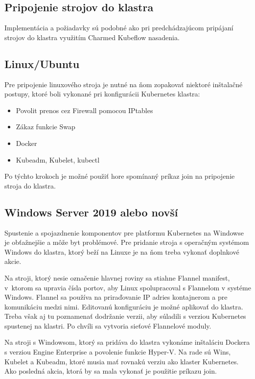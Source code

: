 \subsection{Pripojenie strojov do klastra}

Implementácia a požiadavky sú podobné ako pri predchádzajúcom pripájaní strojov do klastra využitím Charmed Kubeflow nasadenia.

\subsection*{Linux/Ubuntu}

Pre pripojenie linuxového stroja je nutné na ňom zopakovať niektoré inštalačné postupy, ktoré boli vykonané pri konfigurácii Kubernetes klastra:

\begin{itemize}
    \item Povolit prenos cez Firewall pomocou IPtables
    \item Zákaz funkcie Swap
    \item Docker
    \item Kubeadm, Kubelet, kubectl
\end{itemize}

Po týchto krokoch je možné použiť hore spomínaný príkaz join na pripojenie stroja do klastra.

\subsection*{Windows Server 2019 alebo novší}

Spustenie a spojazdnenie komponentov pre platformu Kubernetes na Windowse je obťažnejšie a môže byt problémové. Pre pridanie stroja s operačným systémom Windows do klastra, ktorý beží na Linuxe je na ňom treba vykonať doplnkové akcie.

Na stroji, ktorý nesie označenie hlavnej roviny sa stiahne Flannel manifest, v~ktorom sa upravia čísla portov, aby Linux spolupracoval s Flannelom v systéme Windows. Flannel sa používa na priraďovanie IP adries kontajnerom a pre komunikáciu medzi nimi. Editovanú konfiguráciu je možné aplikovať do klastra. Treba však aj tu poznamenať dodržanie verzii, aby súladili s verziou Kubernetes spustenej na klastri. Po chvíli sa vytvoria sieťové Flannelové moduly.

Na stroji s Windowsom, ktorý sa pridáva do klastra vykonáme inštaláciu Dockera s verziou Engine Enterprise a povolenie funkcie Hyper-V. Na rade sú Wins, Kubelet a Kubeadm, ktoré musia mať rovnakú verziu ako klaster Kubernetes. Ako posledná akcia, ktorá by sa mala vykonať je použitie príkazu join.

